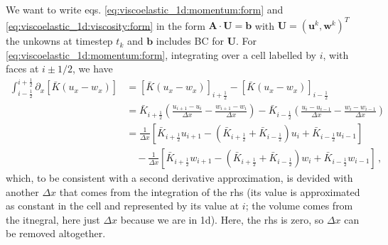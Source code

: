 \documentclass[11pt,a4paper]{article}
\newcommand{\p}{\partial}
\newcommand{\bb}[1]{\boldsymbol{#1}}
\begin{document}
We want to write eqs. \eqref{eq:viscoelastic_1d:momentum:form} and \eqref{eq:viscoelastic_1d:viscosity:form} in the form $\bb{A} \cdot \bb{U} = \bb{b}$ with $\bb{U}=(\bb{u}^k,\bb{w}^k)^T$ the unkowns at timestep $t_k$ and $\bb{b}$ includes BC for $\bb{U}$. For \eqref{eq:viscoelastic_1d:momentum:form}, integrating over a cell labelled by $i$, with faces at $i \pm 1/2$, we have
\begin{align*}
    \int_{i-\frac{1}{2}}^{i+\frac{1}{2}}
    \p_x \left[ \bar{K} (u_x-w_x)\right]
    &
    =
    \left[ \bar{K} (u_x-w_x)\right]_{i+\frac{1}{2}}
    -
    \left[ \bar{K} (u_x-w_x)\right]_{i-\frac{1}{2}}
    \\
    &
    =
    \bar{K}_{i+\frac{1}{2}} 
    \left( 
        \frac{u_{i+1}-u_i}{\Delta x} - \frac{w_{i+1}-w_i}{\Delta x}
    \right)
    -
    \bar{K}_{i-\frac{1}{2}} 
    \left( 
        \frac{u_i-u_{i-1}}{\Delta x} - \frac{w_i-w_{i-1}}{\Delta x}
    \right)
    \\
    &
    =
    \frac{1}{\Delta x}
    \left[
        \bar{K}_{i+\frac{1}{2}} u_{i+1} 
        - \left(\bar{K}_{i+\frac{1}{2}} +\bar{K}_{i-\frac{1}{2}}\right) u_i 
        + \bar{K}_{i-\frac{1}{2}} u_{i-1}
    \right]
    \\
    & \quad
    -\frac{1}{\Delta x}
    \left[
        \bar{K}_{i+\frac{1}{2}} w_{i+1} 
        - \left(\bar{K}_{i+\frac{1}{2}} +\bar{K}_{i-\frac{1}{2}}\right) w_i 
        + \bar{K}_{i-\frac{1}{2}} w_{i-1}
    \right]
    \,,
\end{align*}
which, to be consistent with a second derivative approximation, is devided with another $\Delta x$ that comes from the integration of the rhs (its value is approximated as constant in the cell and represented by its value at $i$; the volume comes from the itnegral, here just $\Delta x$ because we are in 1d). Here, the rhs is zero, so $\Delta x$ can be removed altogether. 
\end{document}
